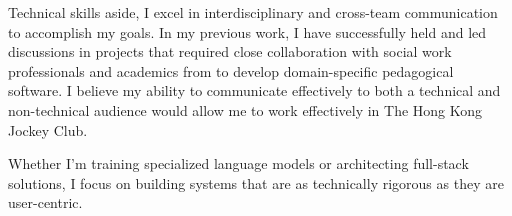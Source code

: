 \documentclass[11pt, a4paper]{awesome-cv}
\begin{document}
\begin{cvletter}
Technical skills aside, I excel in interdisciplinary and cross-team communication to accomplish my goals.
In my previous work, I have successfully held and led discussions in projects that required close collaboration with social work professionals and academics from to develop domain-specific pedagogical software.
I believe my ability to communicate effectively to both a technical and non-technical audience would allow me to work effectively in The Hong Kong Jockey Club.

Whether I’m training specialized language models or architecting full-stack solutions, I focus on building systems that are as technically rigorous as they are user-centric.

\end{cvletter}


\makeletterclosing
\end{document}
